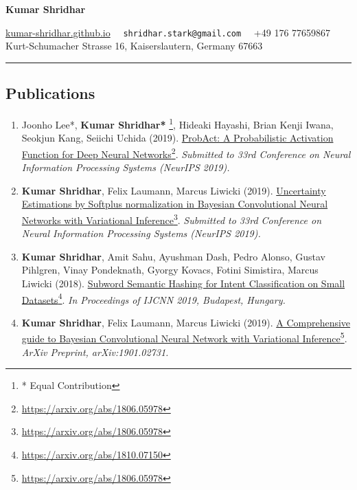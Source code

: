 \documentclass[10pt,letterpaper]{article}
\begin{document}
\begin{center}
{\LARGE \color{MidnightBlue} \textbf{Kumar Shridhar}}

{\color{BrickRed}\url{ kumar-shridhar.github.io}\color{BrickRed}} \textbullet
\ \ \texttt{shridhar.stark@gmail.com} \textbullet
\ \ +49 176 77659867
\\
Kurt-Schumacher Strasse 16, Kaiserslautern, Germany  67663
\end{center}


\hrule
\vspace{-0.4em}
\subsection*{\color{MidnightBlue}Publications}

\begin{enumerate}
	\parskip=0.1em
	
	\item Joonho Lee*, \textbf{Kumar Shridhar*} \footnote{* Equal Contribution}, Hideaki Hayashi, Brian Kenji Iwana, Seokjun Kang, Seiichi Uchida (2019). \href{https://arxiv.org/abs/1905.10761}{ProbAct: A Probabilistic Activation Function for Deep Neural Networks}\footnote{\url{https://arxiv.org/abs/1806.05978}}. \emph{Submitted to 33rd Conference on Neural Information Processing Systems (NeurIPS 2019).}
	
	\item\textbf{Kumar Shridhar}, Felix Laumann, Marcus Liwicki (2019). \href{https://arxiv.org/abs/1806.05978}{Uncertainty Estimations by Softplus normalization in Bayesian Convolutional Neural Networks with Variational Inference}\footnote{\url{https://arxiv.org/abs/1806.05978}}. \emph{Submitted to 33rd Conference on Neural Information Processing Systems (NeurIPS 2019).}
	
	\item\textbf{Kumar Shridhar}, Amit Sahu, Ayushman Dash, Pedro Alonso, Gustav Pihlgren, Vinay Pondeknath,  Gyorgy Kovacs, Fotini Simistira, Marcus Liwicki (2018). \href{https://arxiv.org/abs/1810.07150}{Subword Semantic Hashing for Intent Classification on Small Datasets}\footnote{\url{https://arxiv.org/abs/1810.07150}}. \emph{In Proceedings of IJCNN 2019, Budapest, Hungary.}
	
	\item\textbf{Kumar Shridhar},  Felix Laumann, Marcus Liwicki (2019). \href{https://arxiv.org/abs/1901.02731}{A Comprehensive guide to Bayesian Convolutional Neural Network with Variational Inference}\footnote{\url{https://arxiv.org/abs/1806.05978}}. \emph{ArXiv Preprint, arXiv:1901.02731.}
	
\end{enumerate}
\end{document}

